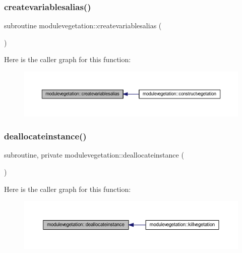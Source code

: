 \subsubsection{\texorpdfstring{createvariablesalias()}{createvariablesalias()}}
{\footnotesize\ttfamily subroutine modulevegetation\+::createvariablesalias (\begin{DoxyParamCaption}{ }\end{DoxyParamCaption})\hspace{0.3cm}{\ttfamily [private]}}

Here is the caller graph for this function\+:\nopagebreak
\begin{figure}[H]
\begin{center}
\leavevmode
\includegraphics[width=350pt]{namespacemodulevegetation_ae10e09bee209b569a0f021506b4bbf27_icgraph}
\end{center}
\end{figure}
\mbox{\label{namespacemodulevegetation_a6be2722d95215f594c5f964837e1e955}} 
\subsubsection{\texorpdfstring{deallocateinstance()}{deallocateinstance()}}
{\footnotesize\ttfamily subroutine, private modulevegetation\+::deallocateinstance (\begin{DoxyParamCaption}{ }\end{DoxyParamCaption})\hspace{0.3cm}{\ttfamily [private]}}

Here is the caller graph for this function\+:\nopagebreak
\begin{figure}[H]
\begin{center}
\leavevmode
\includegraphics[width=350pt]{namespacemodulevegetation_a6be2722d95215f594c5f964837e1e955_icgraph}
\end{center}
\end{figure}
\mbox{\label{namespacemodulevegetation_a4208f430811c220efd414cd21312b73d}} 

